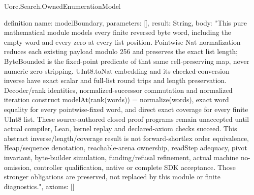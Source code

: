 \begin{lexlean}{Uorc.Search.OwnedEnumerationModel}
\begin{semanticmodule}
definition{
  name: modelBoundary,
  parameters: [],
  result: String,
  body: "This pure mathematical module models every finite reversed byte word, including the empty word and every zero at every list position. Pointwise Nat normalization reduces each existing payload modulo 256 and preserves the exact list length; ByteBounded is the fixed-point predicate of that same cell-preserving map, never numeric zero stripping. UInt8.toNat embedding and its checked-conversion inverse have exact scalar and full-list round trips and length preservation. Decoder/rank identities, normalized-successor commutation and normalized iteration construct modelAt(rank(words)) = normalize(words), exact word equality for every pointwise-fixed word, and direct exact coverage for every finite UInt8 list. These source-authored closed proof programs remain unaccepted until actual compiler, Lean, kernel replay and declared-axiom checks succeed. This abstract inverse/length/coverage result is not forward-shortlex order equivalence, Heap/sequence denotation, reachable-arena ownership, readStep adequacy, pivot invariant, byte-builder simulation, funding/refusal refinement, actual machine no-omission, controller qualification, native or complete SDK acceptance. Those stronger obligations are preserved, not replaced by this module or finite diagnostics.",
  axioms: []
}
\end{semanticmodule}
\end{lexlean}
